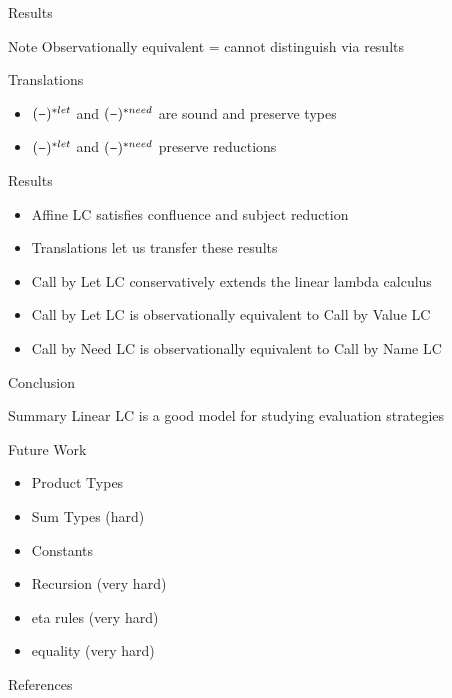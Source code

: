 \documentclass[10pt]{beamer}
\newcommand{\minus}{\scalebox{0.75}[1.0]{$-$}}
\begin{document}
\begin{frame}[fragile]{Results}
  \begin{alertblock}{Note}
    Observationally equivalent = cannot distinguish via results
  \end{alertblock}

  \begin{alertblock}{Translations}
    \begin{itemize}
      \item $(\minus)^{*let}$ and $(\minus)^{*need}$ are sound and preserve types
      \item $(\minus)^{*let}$ and $(\minus)^{*need}$ preserve reductions
    \end{itemize}
  \end{alertblock}

  \begin{alertblock}{Results}
    \begin{itemize}[<+->]
      \item Affine LC satisfies confluence and subject reduction
      \item Translations let us transfer these results
      \item Call by Let LC conservatively extends the linear lambda calculus
      \item Call by Let LC is observationally equivalent to Call by Value LC
      \item Call by Need LC is observationally equivalent to Call by Name LC
    \end{itemize}
  \end{alertblock}

\end{frame}


\begin{frame}{Conclusion}


  \begin{alertblock}{Summary}
    Linear LC is a good model for studying evaluation strategies
  \end{alertblock}

  \pause

  \begin{alertblock}{Future Work}
    \begin{itemize}
      \item Product Types
      \item Sum Types (hard)
      \item Constants
      \item Recursion (very hard)
      \item eta rules (very hard)
      \item equality (very hard)
    \end{itemize}
  \end{alertblock}

\end{frame}


\begin{frame}[allowframebreaks]{References}
  \cite{Maraist1995Jan} \\
  
  
\end{frame}
\end{document}
